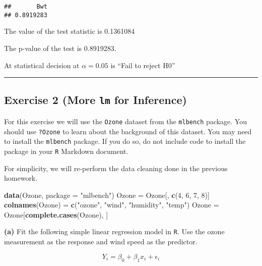 \documentclass[
]{article}
\newenvironment{Shaded}{\begin{snugshade}}{\end{snugshade}}
\newcommand{\DataTypeTok}[1]{\textcolor[rgb]{0.13,0.29,0.53}{#1}}
\newcommand{\DecValTok}[1]{\textcolor[rgb]{0.00,0.00,0.81}{#1}}
\newcommand{\KeywordTok}[1]{\textcolor[rgb]{0.13,0.29,0.53}{\textbf{#1}}}
\newcommand{\NormalTok}[1]{#1}
\newcommand{\StringTok}[1]{\textcolor[rgb]{0.31,0.60,0.02}{#1}}
\begin{document}
\begin{verbatim}
##       Bwt 
## 0.8919283
\end{verbatim}

The value of the test statistic is 0.1361084

The p-value of the test is 0.8919283.

At statistical decision at \(\alpha = 0.05\) is ``Fail to reject H0''

\begin{center}\rule{0.5\linewidth}{0.5pt}\end{center}

\hypertarget{exercise-2-more-lm-for-inference}{%
\subsection{\texorpdfstring{Exercise 2 (More \texttt{lm} for
Inference)}{Exercise 2 (More lm for Inference)}}\label{exercise-2-more-lm-for-inference}}

For this exercise we will use the \texttt{Ozone} dataset from the
\texttt{mlbench} package. You should use \texttt{?Ozone} to learn about
the background of this dataset. You may need to install the
\texttt{mlbench} package. If you do so, do not include code to install
the package in your \texttt{R} Markdown document.

For simplicity, we will re-perform the data cleaning done in the
previous homework.

\begin{Shaded}
\begin{Highlighting}[]
\KeywordTok{data}\NormalTok{(Ozone, }\DataTypeTok{package =} \StringTok{"mlbench"}\NormalTok{)}
\NormalTok{Ozone =}\StringTok{ }\NormalTok{Ozone[, }\KeywordTok{c}\NormalTok{(}\DecValTok{4}\NormalTok{, }\DecValTok{6}\NormalTok{, }\DecValTok{7}\NormalTok{, }\DecValTok{8}\NormalTok{)]}
\KeywordTok{colnames}\NormalTok{(Ozone) =}\StringTok{ }\KeywordTok{c}\NormalTok{(}\StringTok{"ozone"}\NormalTok{, }\StringTok{"wind"}\NormalTok{, }\StringTok{"humidity"}\NormalTok{, }\StringTok{"temp"}\NormalTok{)}
\NormalTok{Ozone =}\StringTok{ }\NormalTok{Ozone[}\KeywordTok{complete.cases}\NormalTok{(Ozone), ]}
\end{Highlighting}
\end{Shaded}

\textbf{(a)} Fit the following simple linear regression model in
\texttt{R}. Use the ozone measurement as the response and wind speed as
the predictor.

\[
Y_i = \beta_0 + \beta_1 x_i + \epsilon_i
\]
\end{document}
